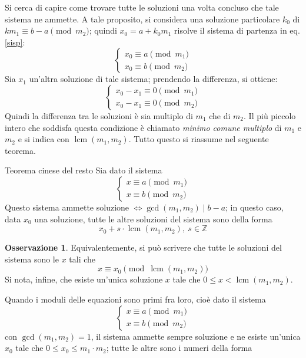 \documentclass[11pt, a4paper]{scrartcl}
\theoremstyle{definition}
\numberwithin{esempio}{section}
\theoremstyle{definition}
\newtheorem{obs}{Osservazione}
\numberwithin{obs}{section}
\numberwithin{nota}{section}
\numberwithin{equation}{subsection}
\begin{document}
Si cerca di capire come trovare tutte le soluzioni una volta concluso che tale sistema ne ammette.
A tale proposito, si considera una soluzione particolare $k_0$ di $km_1 \equiv b-a \pmod{m_2} $; quindi $x_0 = a + k_0 m_1$ risolve il sistema di partenza in eq. \ref{sisp}:
\[
\begin{cases}
	x_0 \equiv a \pmod{m_1} \\
	x_0 \equiv b \pmod{m_2} 
\end{cases}
\] 
Sia $x_1$ un'altra soluzione di tale sistema; prendendo la differenza, si ottiene:
\[
	\begin{cases}
x_0-x_1 \equiv 0 \pmod{m_1} \\
x_0-x_1\equiv 0 \pmod{m_2} 
	\end{cases}
\] 
Quindi la differenza tra le soluzioni \`e sia multiplo di $m_1$ che di $m_2$.
Il pi\`u piccolo intero che soddisfa questa condizione \`e chiamato \textit{minimo comune multiplo} di $m_1$ e $m_2$ e si indica con $\operatorname{lcm} (m_1,m_2)$.
Tutto questo si riassume nel seguente teorema.
\begin{teorema}
	{Teorema cinese del resto}{}
	Sia dato il sistema 
	\[
	\begin{cases}
		x\equiv a \pmod{m_1} \\
		x \equiv b \pmod{m_2} 
	\end{cases}
	\] 
Questo sistema ammette soluzione $\iff \operatorname{gcd}(m_1,m_2)  \mid b-a$; in questo caso, data $x_0$ una soluzione, tutte le altre soluzioni del sistema sono della forma
\[
x_0 + s \cdot \operatorname{lcm} (m_1,m_2) ,\ s \in \mathbb{Z}
\] 
\end{teorema}
\begin{obs}
	Equivalentemente, si pu\`o scrivere che tutte le soluzioni del sistema sono le $x$ tali che
	\begin{equation}
		x\equiv x_0 \pmod{\operatorname{lcm} (m_1,m_2)} 
	\end{equation}
	Si nota, infine, che esiste un'unica soluzione $x $ tale che $0\le  x < \operatorname{lcm} (m_1,m_2)$.
\end{obs}
Quando i moduli delle equazioni sono primi fra loro, cio\`e dato il sistema 
\[
\begin{cases}
	x \equiv a \pmod{m_1} \\
	x \equiv b \pmod{m_2} 
\end{cases}
\] 
con $\operatorname{gcd}(m_1,m_2) =1$, il sistema ammette sempre soluzione e ne esiste un'unica $x_0$ tale che $0\le x_0\le m_1\cdot m_2$; tutte le altre sono i numeri della forma
\end{document}

